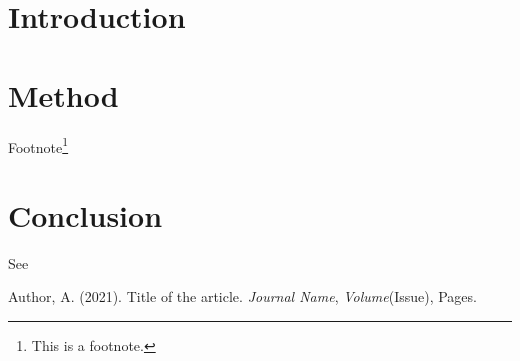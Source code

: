 \documentclass{texyise}
\begin{document}
\section{Introduction}

\lipsum[1]

\section{Method}

\lipsum[10-20]

Footnote\footnote{This is a footnote.}

\lipsum[21-40]

\section{Conclusion}

\lipsum[4]

See \cite{ref1}

\begin{thebibliography}{}
   
     Author, A. (2021). Title of the article. \textit{Journal Name}, \textit{Volume}(Issue), Pages.

\end{thebibliography}
\end{document}
